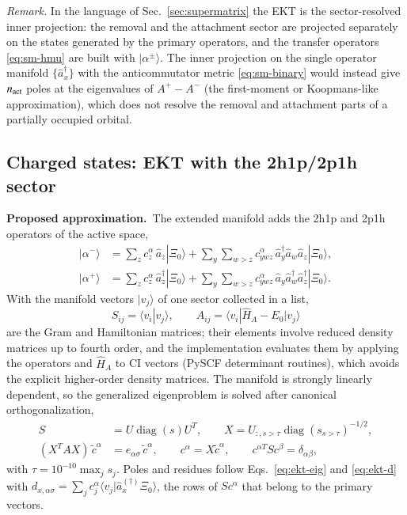 \documentclass[aip,jcp,reprint,noshowkeys,superscriptaddress]{revtex4-1}
\newcommand{\Proposed}{\textbf{Proposed approximation.}\ }
\begin{document}
\emph{Remark.}  In the language of Sec.~\ref{sec:supermatrix} the EKT is
the sector-resolved inner projection: the removal and the attachment
sector are projected separately on the states generated by the primary
operators, and the transfer operators \eqref{eq:sm-hmu} are built with
$|\alpha^{\pm}\rangle$.  The inner projection on the single operator
manifold $\{\hat a_x^\dagger\}$ with the anticommutator metric
\eqref{eq:sm-binary} would instead give $n_{\rm act}$ poles at the
eigenvalues of $A^{+}-A^{-}$ (the first-moment or Koopmans-like
approximation), which does not resolve the removal and attachment parts
of a partially occupied orbital.

\subsection{Charged states: EKT with the 2h1p/2p1h sector}
\label{sec:ekt-extended}

\Proposed The extended manifold adds the 2h1p and 2p1h operators of the
active space,
\begin{align}
  |\alpha^-\rangle&=\sum_zc^{\alpha}_z\,\hat a_z|\Xi_0\rangle
  +\sum_{y}\sum_{w>z}c^{\alpha}_{ywz}\,\hat a_y^\dagger\hat a_w\hat a_z|\Xi_0\rangle ,
  \nonumber\\
  |\alpha^+\rangle&=\sum_zc^{\alpha}_z\,\hat a_z^\dagger|\Xi_0\rangle
  +\sum_{y}\sum_{w>z}c^{\alpha}_{ywz}\,\hat a_y\hat a_w^\dagger\hat a_z^\dagger|\Xi_0\rangle .
  \label{eq:ekt2-states}
\end{align}
With the manifold vectors $|v_j\rangle$ of one sector collected in a list,
\begin{equation}
  S_{ij}=\langle v_i|v_j\rangle,\qquad
  A_{ij}=\langle v_i|\hat H_A-E_0|v_j\rangle
  \label{eq:ekt2-AS}
\end{equation}
are the Gram and Hamiltonian matrices; their elements involve reduced
density matrices up to fourth order, and the implementation evaluates them
by applying the operators and $\hat H_A$ to CI vectors (PySCF determinant
routines), which avoids the explicit higher-order density matrices.  The
manifold is strongly linearly dependent, so the generalized eigenproblem
is solved after canonical orthogonalization,
\begin{align}
  S&=U\operatorname{diag}(s)U^{T},\qquad
  X=U_{:,s>\tau}\operatorname{diag}(s_{s>\tau})^{-1/2},
  \nonumber\\
  (X^{T}AX)\,\tilde c^{\alpha}&=e_{\alpha\sigma}\,\tilde c^{\alpha},\qquad
  c^{\alpha}=X\tilde c^{\alpha},\qquad
  c^{\alpha T}Sc^{\beta}=\delta_{\alpha\beta},
  \label{eq:ekt2-canon}
\end{align}
with $\tau=10^{-10}\max_js_j$.  Poles and residues follow
Eqs.~\eqref{eq:ekt-eig} and \eqref{eq:ekt-d} with
$d_{x,\alpha\sigma}=\sum_jc^{\alpha}_j\langle v_j|\hat a_x^{(\dagger)}\Xi_0\rangle$,
the rows of $Sc^{\alpha}$ that belong to the primary vectors.
\end{document}
